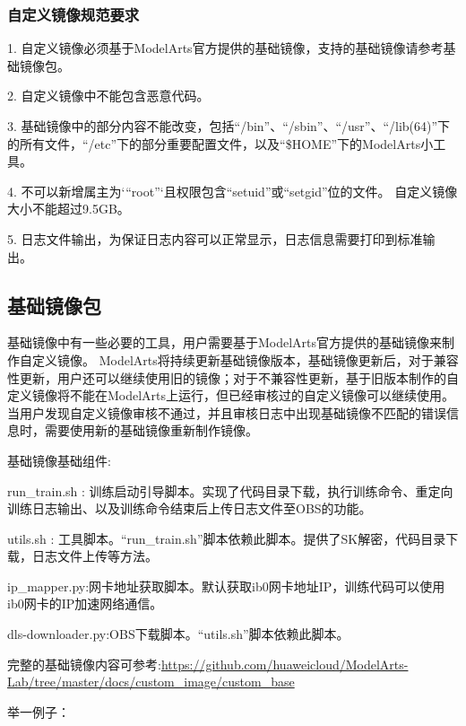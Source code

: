 \documentclass[fontset=windows,openany,UTF8]{ctexbook}
\begin{document}
\subsubsection{自定义镜像规范要求}

1. 自定义镜像必须基于ModelArts官方提供的基础镜像，支持的基础镜像请参考基础镜像包。

2. 自定义镜像中不能包含恶意代码。

3. 基础镜像中的部分内容不能改变，包括“/bin”、“/sbin”、“/usr”、“/lib(64)”下的所有文件，“/etc”下的部分重要配置文件，以及“\$HOME”下的ModelArts小工具。

4. 不可以新增属主为`“root”`且权限包含“setuid”或“setgid”位的文件。
自定义镜像大小不能超过9.5GB。

5. 日志文件输出，为保证日志内容可以正常显示，日志信息需要打印到标准输出。

\subsection{基础镜像包}

基础镜像中有一些必要的工具，用户需要基于ModelArts官方提供的基础镜像来制作自定义镜像。
ModelArts将持续更新基础镜像版本，基础镜像更新后，对于兼容性更新，用户还可以继续使用旧的镜像；对于不兼容性更新，基于旧版本制作的自定义镜像将不能在ModelArts上运行，但已经审核过的自定义镜像可以继续使用。
当用户发现自定义镜像审核不通过，并且审核日志中出现基础镜像不匹配的错误信息时，需要使用新的基础镜像重新制作镜像。

基础镜像基础组件:

run\_train.sh : 训练启动引导脚本。实现了代码目录下载，执行训练命令、重定向训练日志输出、以及训练命令结束后上传日志文件至OBS的功能。

utils.sh : 工具脚本。“run\_train.sh”脚本依赖此脚本。提供了SK解密，代码目录下载，日志文件上传等方法。

ip\_mapper.py:网卡地址获取脚本。默认获取ib0网卡地址IP，训练代码可以使用ib0网卡的IP加速网络通信。

dls-downloader.py:OBS下载脚本。“utils.sh”脚本依赖此脚本。

完整的基础镜像内容可参考:\url{https://github.com/huaweicloud/ModelArts-Lab/tree/master/docs/custom_image/custom_base}

举一例子：
\end{document}
